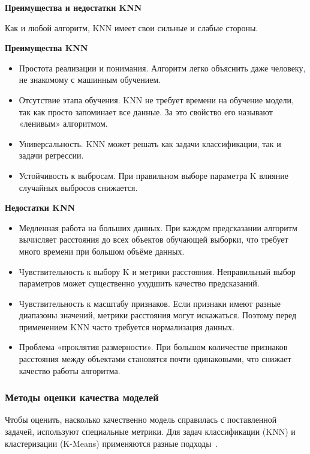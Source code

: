 \documentclass[14pt, a4paper]{extarticle}
\begin{document}
\textbf{Преимущества и недостатки KNN}
\smallskip

Как и любой алгоритм, KNN имеет свои сильные и слабые стороны.

\textbf{Преимущества KNN}
\smallskip

\begin{itemize}
    \item Простота реализации и понимания. Алгоритм легко объяснить даже человеку, не знакомому с машинным обучением.
    \item Отсутствие этапа обучения. KNN не требует времени на обучение модели, так как просто запоминает все данные. За это свойство его называют «ленивым» алгоритмом.
    \item Универсальность. KNN может решать как задачи классификации, так и задачи регрессии.
    \item Устойчивость к выбросам. При правильном выборе параметра K влияние случайных выбросов снижается.
\end{itemize}

\textbf{Недостатки KNN}
\smallskip

\begin{itemize}
    \item Медленная работа на больших данных. При каждом предсказании алгоритм вычисляет расстояния до всех объектов обучающей выборки, что требует много времени при большом объёме данных.
    \item Чувствительность к выбору K и метрики расстояния. Неправильный выбор параметров может существенно ухудшить качество предсказаний.
    \item Чувствительность к масштабу признаков. Если признаки имеют разные диапазоны значений, метрики расстояния могут искажаться. Поэтому перед применением KNN часто требуется нормализация данных.
    \item Проблема «проклятия размерности». При большом количестве признаков расстояния между объектами становятся почти одинаковыми, что снижает качество работы алгоритма.
\end{itemize}


\subsubsection{Методы оценки качества моделей}

Чтобы оценить, насколько качественно модель справилась с поставленной задачей, используют специальные метрики. Для задач классификации (KNN) и кластеризации (K-Means) применяются разные подходы~\cite{vorontsov}.
\end{document}
